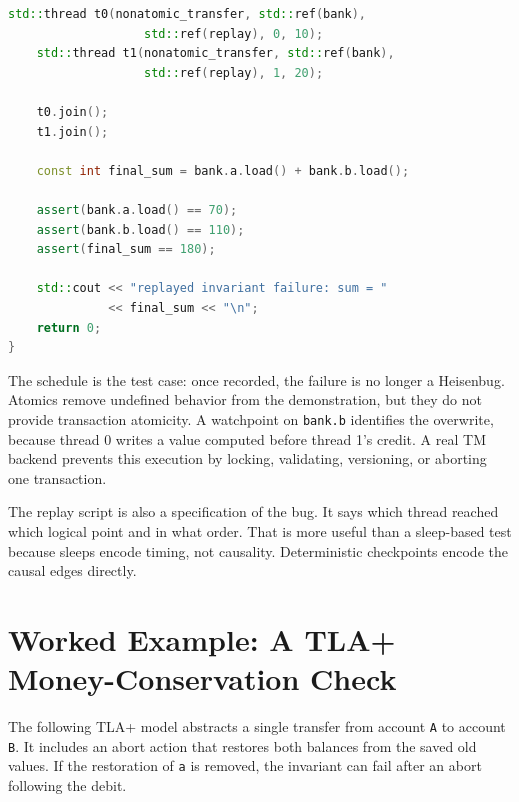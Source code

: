 \begin{lstlisting}[language=C++, caption={A deterministic replay schedule that exposes a non-atomic transfer.}]
    std::thread t0(nonatomic_transfer, std::ref(bank),
                   std::ref(replay), 0, 10);
    std::thread t1(nonatomic_transfer, std::ref(bank),
                   std::ref(replay), 1, 20);

    t0.join();
    t1.join();

    const int final_sum = bank.a.load() + bank.b.load();

    assert(bank.a.load() == 70);
    assert(bank.b.load() == 110);
    assert(final_sum == 180);

    std::cout << "replayed invariant failure: sum = "
              << final_sum << "\n";
    return 0;
}
\end{lstlisting}

The schedule is the test case: once recorded, the failure is no longer a Heisenbug. Atomics remove undefined behavior from the demonstration, but they do not provide transaction atomicity. A watchpoint on \texttt{bank.b} identifies the overwrite, because thread 0 writes a value computed before thread 1's credit. A real TM backend prevents this execution by locking, validating, versioning, or aborting one transaction.

The replay script is also a specification of the bug. It says which thread reached which logical point and in what order. That is more useful than a sleep-based test because sleeps encode timing, not causality. Deterministic checkpoints encode the causal edges directly.

\section{Worked Example: A TLA+ Money-Conservation Check}
\label{sec:tla-bank-conservation}

The following TLA+ model abstracts a single transfer from account \texttt{A} to account \texttt{B}. It includes an abort action that restores both balances from the saved old values. If the restoration of \texttt{a} is removed, the invariant can fail after an abort following the debit.

